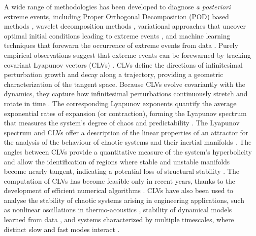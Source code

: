 \documentclass[aps,reprint,prx]{revtex4-2}
\begin{document}
A wide range of methodologies has been developed to diagnose {\it a posteriori} extreme events, including Proper Orthogonal Decomposition (POD) based methods \cite{martinConditionalPODPredicting2025, schmidtConditionalSpaceTime2019}, wavelet decomposition methods \cite{madhusudananPredictingBurstEvents2025}, variational approaches that uncover optimal initial conditions leading to extreme events \cite{farazmandVariationalApproachProbing2017, bloniganAreExtremeDissipation2019}, and machine learning techniques that forewarn the occurrence of extreme events from data \cite[e.g.,][]{doan2021short, raccaDatadrivenPredictionControl2022a, pickeringDiscoveringForecastingExtreme2022, jiangPredictingExtremeEvents2022, foxPredictingExtremeEvents2023}.
Purely empirical observations suggest that extreme events can be forewarned by tracking covariant Lyapunov vectors (CLVs) \cite{beimsAlignmentLyapunovVectors2016, sharafiCriticalTransitionsPerturbation2017}. CLVs \cite{ruelleErgodicTheoryDifferentiable1979, ginelliCovariantLyapunovVectors2013} define the directions of infinitesimal perturbation growth and decay along a trajectory, providing a geometric characterization of the tangent space. Because CLVs evolve covariantly with the dynamics, they capture how infinitesimal perturbations continuously stretch and rotate in time \cite{kuptsovTheoryComputationCovariant2012}. The corresponding Lyapunov exponents quantify the average exponential rates of expansion (or contraction), forming the Lyapunov spectrum that measures the system's degree of chaos and predictability \cite{pikovskyLyapunovExponentsTool2016}. The Lyapunov spectrum and CLVs offer a description of the linear properties of an attractor for the analysis of the behaviour of chaotic systems and their inertial manifolds \cite{yangHyperbolicityEffectiveDimension2009a, yangCovariantLyapunovVectors2012, dingEstimatingDimensionInertial2016}. The angles between CLVs provide a quantitative measure of the system's hyperbolicity and allow the identification of regions where stable and unstable manifolds become nearly tangent, indicating a potential loss of structural stability \cite{kuptsovLyapunovAnalysisStrange2018}. The computation of CLVs has become feasible only in recent years, thanks to the development of efficient numerical algorithms \cite{ginelliCharacterizingDynamicsCovariant2007, wolfeEfficientMethodRecovering2007, froylandComputingCovariantLyapunov2013}. CLVs have also been used to analyse the stability of chaotic systems arising in engineering applications, such as nonlinear oscillations in thermo-acoustics \cite{huhnStabilitySensitivityOptimisation2020, moreira_huhn_2021}, stability of dynamical models learned from data \cite{margazoglouStabilityAnalysisChaotic2023, ozalpReconstructionForecastingStability2023, ozalpStabilityAnalysisChaotic2025, ahmedRobustQuantumReservoir2025}, and systems characterized by multiple timescales, where distinct slow and fast modes interact \cite{eckmannHydrodynamicLyapunovModes2000, carluLyapunovAnalysisMultiscale2019}.
\end{document}
